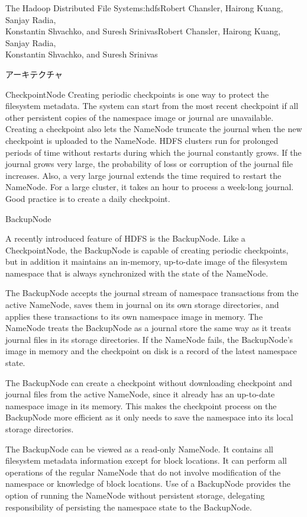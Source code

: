 \begin{aosachaptertoc}{The Hadoop Distributed File System}{s:hdfs}{Robert Chansler, Hairong Kuang, Sanjay Radia, \\ Konstantin Shvachko, and Suresh Srinivas}{Robert Chansler, Hairong Kuang, Sanjay Radia, \\ \hspace*{0.9cm} Konstantin Shvachko, and Suresh Srinivas}
\begin{aosasect1}{アーキテクチャ}
\begin{aosasect2}{CheckpointNode}
Creating periodic checkpoints is one way to protect the filesystem
metadata. The system can start from the most recent checkpoint if all
other persistent copies of the namespace image or journal are
unavailable. Creating a checkpoint also lets the NameNode truncate the
journal when the new checkpoint is uploaded to the NameNode.  HDFS
clusters run for prolonged periods of time without restarts during
which the journal constantly grows. If the journal grows very large,
the probability of loss or corruption of the journal file
increases. Also, a very large journal extends the time required to
restart the NameNode. For a large cluster, it takes an hour to process
a week-long journal. Good practice is to create a daily checkpoint.

\end{aosasect2}

\begin{aosasect2}{BackupNode}

A recently introduced feature of HDFS is the BackupNode. Like a
CheckpointNode, the BackupNode is capable of creating periodic
checkpoints, but in addition it maintains an in-memory, up-to-date
image of the filesystem namespace that is always synchronized with
the state of the NameNode.

The BackupNode accepts the journal stream of namespace transactions
from the active NameNode, saves them in journal on its own storage
directories, and applies these transactions to its own namespace image
in memory. The NameNode treats the BackupNode as a journal store the
same way as it treats journal files in its storage directories. If the
NameNode fails, the BackupNode's image in memory and the checkpoint on
disk is a record of the latest namespace state.

The BackupNode can create a checkpoint without downloading checkpoint
and journal files from the active NameNode, since it already has an
up-to-date namespace image in its memory. This makes the checkpoint
process on the BackupNode more efficient as it only needs to save the
namespace into its local storage directories.

The BackupNode can be viewed as a read-only NameNode. It contains all
filesystem metadata information except for block locations. It can
perform all operations of the regular NameNode that do not involve
modification of the namespace or knowledge of block locations. Use of
a BackupNode provides the option of running the NameNode without
persistent storage, delegating responsibility of persisting the
namespace state to the BackupNode.


\end{aosasect2}
\end{aosasect1}
\end{aosachaptertoc}
